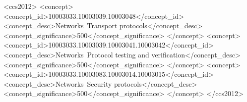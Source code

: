 \documentclass[sigconf]{acmart}
\begin{document}
\begin{CCSXML}
<ccs2012>
<concept>
<concept_id>10003033.10003039.10003048</concept_id>
<concept_desc>Networks~Transport protocols</concept_desc>
<concept_significance>500</concept_significance>
</concept>
<concept>
<concept_id>10003033.10003039.10003041.10003042</concept_id>
<concept_desc>Networks~Protocol testing and verification</concept_desc>
<concept_significance>500</concept_significance>
</concept>
<concept>
<concept_id>10003033.10003083.10003014.10003015</concept_id>
<concept_desc>Networks~Security protocols</concept_desc>
<concept_significance>500</concept_significance>
</concept>
</ccs2012>
\end{CCSXML}



\maketitle










\begin{acks}

\end{acks}


\balance

\end{document}
